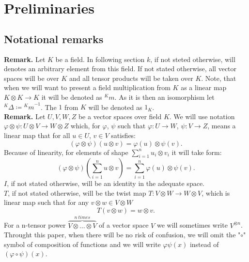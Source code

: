 \documentclass[a4paper, 12pt]{report}
\begin{document}
\section{Preliminaries}

\subsection{Notational remarks}
\indent \textbf{Remark. }Let $K$ be a field. In following section $k$, if not steted otherwise, will
denotes an arbitrary element from this field. If not stated otherwise, all vector spaces will be over $K$ 
and all tensor products will be taken over $K$. Note, that when we will want to present a field 
multiplication from $K$ as a linear map $K \otimes K \to K$ it will be denoted as ${^Km}$. As it is then an 
isomorphism let ${^K\Delta} \coloneqq {^Km}^{-1}$. The $1$ from $K$ will be denoted as $1_K$.\\[8pt]
\textbf{Remark. } Let $U, V, W, Z$ be a vector spaces over field $K$.
We will use notation
$\varphi \otimes \psi:U \otimes V \to W \otimes Z$ which, for
$\varphi$, $\psi$ such that $\varphi : U \to W$, $\psi : V \to Z$, means a linear map that
for all $u \in U$, $v \in V$ satisfies:
\begin{equation*}
(\varphi \otimes \psi)(u \otimes v) = \varphi(u) \otimes \psi(v).
\end{equation*}
Because of linearity, for elements of shape $\displaystyle\sum^n_{i=1} u_i \otimes v_i$ it will take form:
\begin{equation*}
(\varphi \otimes \psi)(\sum^n_{i = 1} u \otimes v) = \sum^n_{i = 1}\varphi(u) \otimes \psi(v).
\end{equation*}
$I$, if not stated otherwise, will be an identity in the adequate space. \\
$T$, if not stated otherwise, will
be the twist map $T:V \otimes W \to W\otimes V$, which is linear map such that for any $v \otimes w
\in V \otimes W$
\begin{equation*}
T(v \otimes w) = w\otimes v.
\end{equation*}
For a n-tensor power $\overbrace{V \otimes \dots \otimes V}^{n\ times}$  of a vector space $V$ we will
sometimes write $V^{\otimes n}$.\\
Throught this paper, when there will be no risk
of confusion, we will omit the "$\circ$" symbol of composition of functions and we will write
$\varphi \psi (x)$ instead of $(\varphi \circ \psi)(x)$.
\end{document}
